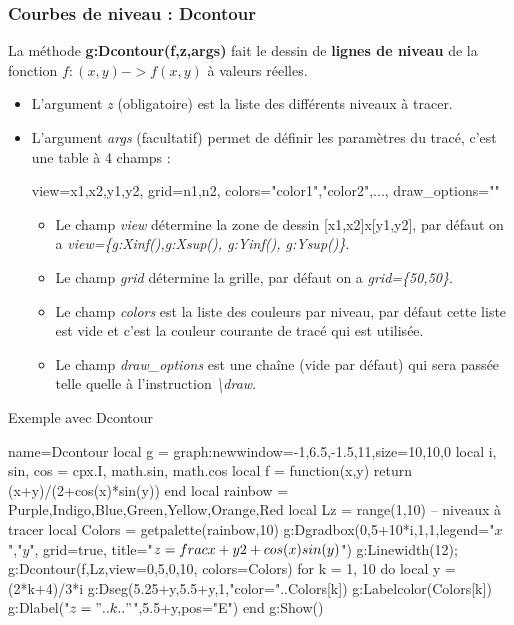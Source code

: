 \subsubsection{Courbes de niveau : Dcontour}

La méthode \textbf{g:Dcontour(f,z,args)} fait le dessin de \textbf{lignes de niveau} de la fonction \(f: (x,y) -> f(x,y)\) à valeurs réelles.

\begin{itemize}
  \item L'argument \emph{z} (obligatoire) est la liste des différents niveaux à tracer.
  \item L'argument \emph{args} (facultatif) permet de définir les paramètres du tracé, c'est une table à 4 champs :
  
  \begin{TeXcode}
    { view={x1,x2,y1,y2}, grid={n1,n2}, colors={"color1","color2",...}, draw_options="" }
  \end{TeXcode}

    \begin{itemize}
        \item Le champ \emph{view} détermine la zone de dessin {[}x1,x2{]}x{[}y1,y2{]}, par défaut on a \emph{view=\{g:Xinf(),g:Xsup(), g:Yinf(), g:Ysup()\}}.
        \item Le champ \emph{grid} détermine la grille, par défaut on a \emph{grid=\{50,50\}}.
        \item Le champ \emph{colors} est la liste des couleurs par niveau, par défaut cette liste est vide et c'est la couleur courante de tracé qui est utilisée.
        \item Le champ \emph{draw\_options} est une chaîne (vide par défaut) qui sera passée telle quelle à l'instruction \emph{\textbackslash draw}.
    \end{itemize}
\end{itemize}

\begin{demo}{Exemple avec Dcontour}
\begin{luadraw}{name=Dcontour}
local g = graph:new{window={-1,6.5,-1.5,11},size={10,10,0}}
local i, sin, cos = cpx.I, math.sin, math.cos
local f = function(x,y) return (x+y)/(2+cos(x)*sin(y)) end
local rainbow = {Purple,Indigo,Blue,Green,Yellow,Orange,Red}
local Lz = range(1,10) -- niveaux à tracer
local Colors = getpalette(rainbow,10)
g:Dgradbox({0,5+10*i,1,1},{legend={"$x$","$y$"}, grid=true, title="$z=\\frac{x+y}{2+\\cos(x)\\sin(y)}$"})
g:Linewidth(12); g:Dcontour(f,Lz,{view={0,5,0,10}, colors=Colors})
for k = 1, 10 do
    local y = (2*k+4)/3*i
    g:Dseg({5.25+y,5.5+y},1,"color="..Colors[k])
    g:Labelcolor(Colors[k])
    g:Dlabel("$z="..k.."$",5.5+y,{pos="E"})
end
g:Show()
\end{luadraw}
\end{demo}

